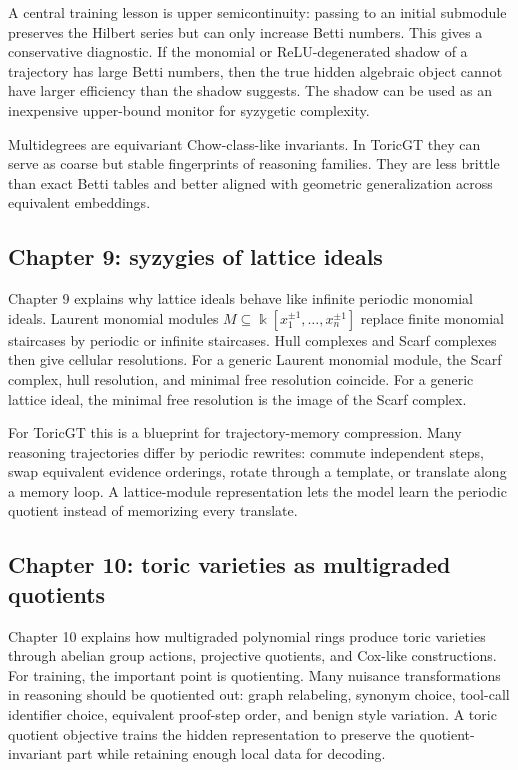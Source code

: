 \documentclass[11pt]{article}
\theoremstyle{definition}
\newcommand{\kk}{\Bbbk}
\begin{document}
A central training lesson is upper semicontinuity: passing to an initial submodule preserves the Hilbert series but can only increase Betti numbers.  This gives a conservative diagnostic.  If the monomial or ReLU-degenerated shadow of a trajectory has large Betti numbers, then the true hidden algebraic object cannot have larger efficiency than the shadow suggests.  The shadow can be used as an inexpensive upper-bound monitor for syzygetic complexity.

Multidegrees are equivariant Chow-class-like invariants.  In ToricGT they can serve as coarse but stable fingerprints of reasoning families.  They are less brittle than exact Betti tables and better aligned with geometric generalization across equivalent embeddings.

\subsection{Chapter 9: syzygies of lattice ideals}
Chapter 9 explains why lattice ideals behave like infinite periodic monomial ideals.  Laurent monomial modules \(M\subseteq \kk[x_1^{\pm1},\ldots,x_n^{\pm1}]\) replace finite monomial staircases by periodic or infinite staircases.  Hull complexes and Scarf complexes then give cellular resolutions.  For a generic Laurent monomial module, the Scarf complex, hull resolution, and minimal free resolution coincide.  For a generic lattice ideal, the minimal free resolution is the image of the Scarf complex.

For ToricGT this is a blueprint for trajectory-memory compression.  Many reasoning trajectories differ by periodic rewrites: commute independent steps, swap equivalent evidence orderings, rotate through a template, or translate along a memory loop.  A lattice-module representation lets the model learn the periodic quotient instead of memorizing every translate.

\subsection{Chapter 10: toric varieties as multigraded quotients}
Chapter 10 explains how multigraded polynomial rings produce toric varieties through abelian group actions, projective quotients, and Cox-like constructions.  For training, the important point is quotienting.  Many nuisance transformations in reasoning should be quotiented out: graph relabeling, synonym choice, tool-call identifier choice, equivalent proof-step order, and benign style variation.  A toric quotient objective trains the hidden representation to preserve the quotient-invariant part while retaining enough local data for decoding.
\end{document}

